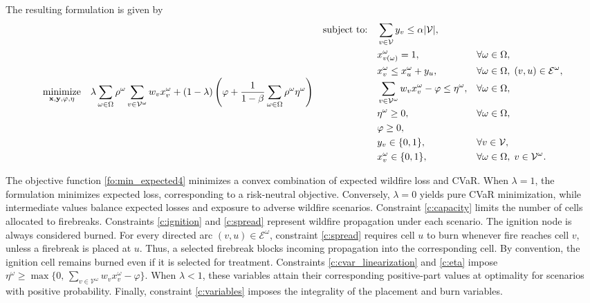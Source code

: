\documentclass[a4paper,fleqn]{cas-sc}
\begin{document}
The resulting formulation is given by
%
\begin{subequations}
\label{m:fpp}
\begin{align}
\underset{\vb{x},\vb{y},\varphi,\vb{\eta}}
{\text{minimize}}
\quad &
\lambda
\sum_{\omega\in\Omega}\rho^\omega
\sum_{v\in\mathcal{V}^\omega}w_vx_v^\omega
+
(1-\lambda)
\left(
\varphi+
\frac{1}{1-\beta}
\sum_{\omega\in\Omega}\rho^\omega\eta^\omega
\right)
\label{fo:min_expected4}
\end{align}
\begin{align}
\text{subject to:}\quad
&
\sum_{v\in\mathcal{V}}y_v
\leq\alpha|\mathcal{V}|,
&&
\label{c:capacity}
\\
&
x_{v(\omega)}^\omega=1,
&&\forall\omega\in\Omega,
\label{c:ignition}
\\
&
x_v^\omega\leq x_u^\omega+y_u,
&&\forall\omega\in\Omega,\;
(v,u)\in\mathcal{E}^\omega,
\label{c:spread}
\\
&
\sum_{v\in\mathcal{V}^\omega}w_vx_v^\omega
-\varphi\leq\eta^\omega,
&&\forall\omega\in\Omega,
\label{c:cvar_linearization}
\\
&
\eta^\omega\geq0,
&&\forall\omega\in\Omega,
\label{c:eta}
\\
&
\varphi\geq0,
&&
\\
&
y_v\in\{0,1\},
&&\forall v\in\mathcal{V},
\nonumber
\\
&
x_v^\omega\in\{0,1\},
&&\forall\omega\in\Omega,\;
v\in\mathcal{V}^\omega.
\label{c:variables}
\end{align}
\end{subequations}

The objective function \eqref{fo:min_expected4} minimizes
a convex combination of expected wildfire loss and CVaR.
When $\lambda=1$, the formulation minimizes expected loss,
corresponding to a risk-neutral objective. Conversely,
$\lambda=0$ yields pure CVaR minimization, while intermediate
values balance expected losses and exposure to adverse
wildfire scenarios. Constraint \eqref{c:capacity} limits the number of cells
allocated to firebreaks. Constraints \eqref{c:ignition}
and \eqref{c:spread} represent wildfire propagation
under each scenario. The ignition node is always considered
burned. For every directed arc
$(v,u)\in\mathcal{E}^\omega$, constraint
\eqref{c:spread} requires cell $u$ to burn whenever
fire reaches cell $v$, unless a firebreak is placed
at $u$. Thus, a selected firebreak blocks incoming
propagation into the corresponding cell. By convention,
the ignition cell remains burned even if it is
selected for treatment. Constraints \eqref{c:cvar_linearization} and
\eqref{c:eta} impose
$\eta^\omega\geq
\max\{
0,\,
\sum_{v\in\mathcal{V}^\omega}
w_vx_v^\omega-\varphi
\}$. When $\lambda<1$, these variables attain their
corresponding positive-part values at optimality
for scenarios with positive probability.
Finally, constraint \eqref{c:variables} imposes
the integrality of the placement and burn variables.
\end{document}
